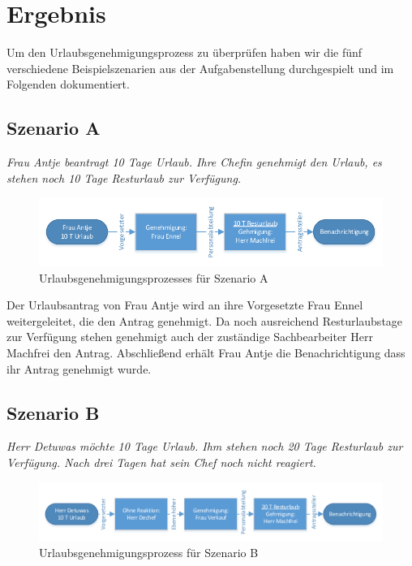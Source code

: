 \section{Ergebnis}
Um den Urlaubsgenehmigungsprozess zu überprüfen haben wir die fünf verschiedene Beispielszenarien aus der Aufgabenstellung durchgespielt und im Folgenden dokumentiert.

\subsection{Szenario A}
\textit{Frau Antje beantragt 10 Tage Urlaub. Ihre Chefin genehmigt den Urlaub, es stehen noch 10 Tage Resturlaub zur Verfügung.}

\begin{figure}[H]
\centering
\includegraphics[width=1.0\linewidth]{Bilder/BeispielA}
\caption{Urlaubsgenehmigungsprozesses für Szenario A}
\label{fig:BeispielA}
\end{figure}

Der Urlaubsantrag von Frau Antje wird an ihre Vorgesetzte Frau Ennel weitergeleitet, die den Antrag genehmigt. Da noch ausreichend Resturlaubstage zur Verfügung stehen genehmigt auch der zuständige Sachbearbeiter Herr Machfrei den Antrag. Abschließend erhält Frau Antje die Benachrichtigung dass ihr Antrag genehmigt wurde.

\subsection{Szenario B}
\textit{Herr Detuwas möchte 10 Tage Urlaub. Ihm stehen noch 20 Tage Resturlaub zur Verfügung. Nach drei Tagen hat sein Chef noch nicht reagiert.}

\begin{figure}[H]
\centering
\includegraphics[width=1.0\linewidth]{Bilder/BeispielB}
\caption{Urlaubsgenehmigungsprozess für Szenario B}
\label{fig:BeispielB}
\end{figure}

